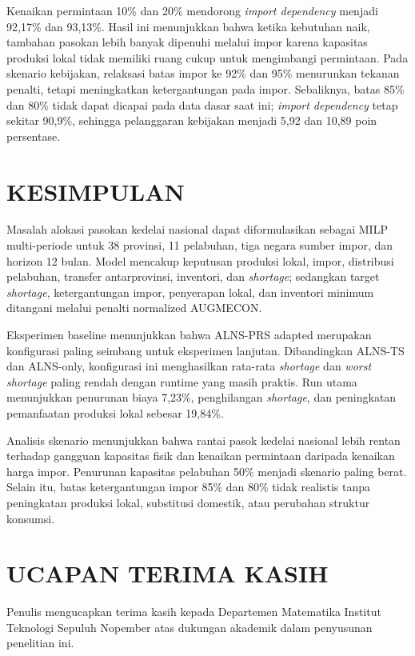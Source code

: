 \documentclass[journal]{IEEEtran}
\theoremstyle{definition}
\theoremstyle{definition}
\theoremstyle{plain}
\begin{document}
    Kenaikan permintaan 10\% dan 20\% mendorong \textit{import dependency} menjadi 92,17\% dan 93,13\%. Hasil ini menunjukkan bahwa ketika kebutuhan naik, tambahan pasokan lebih banyak dipenuhi melalui impor karena kapasitas produksi lokal tidak memiliki ruang cukup untuk mengimbangi permintaan. Pada skenario kebijakan, relaksasi batas impor ke 92\% dan 95\% menurunkan tekanan penalti, tetapi meningkatkan ketergantungan pada impor. Sebaliknya, batas 85\% dan 80\% tidak dapat dicapai pada data dasar saat ini; \textit{import dependency} tetap sekitar 90,9\%, sehingga pelanggaran kebijakan menjadi 5,92 dan 10,89 poin persentase.

    \section{KESIMPULAN}
    Masalah alokasi pasokan kedelai nasional dapat diformulasikan sebagai MILP multi-periode untuk 38 provinsi, 11 pelabuhan, tiga negara sumber impor, dan horizon 12 bulan. Model mencakup keputusan produksi lokal, impor, distribusi pelabuhan, transfer antarprovinsi, inventori, dan \textit{shortage}; sedangkan target \textit{shortage}, ketergantungan impor, penyerapan lokal, dan inventori minimum ditangani melalui penalti normalized AUGMECON.

    Eksperimen baseline menunjukkan bahwa ALNS-PRS adapted merupakan konfigurasi paling seimbang untuk eksperimen lanjutan. Dibandingkan ALNS-TS dan ALNS-only, konfigurasi ini menghasilkan rata-rata \textit{shortage} dan \textit{worst shortage} paling rendah dengan runtime yang masih praktis. Run utama menunjukkan penurunan biaya 7,23\%, penghilangan \textit{shortage}, dan peningkatan pemanfaatan produksi lokal sebesar 19,84\%.

    Analisis skenario menunjukkan bahwa rantai pasok kedelai nasional lebih rentan terhadap gangguan kapasitas fisik dan kenaikan permintaan daripada kenaikan harga impor. Penurunan kapasitas pelabuhan 50\% menjadi skenario paling berat. Selain itu, batas ketergantungan impor 85\% dan 80\% tidak realistis tanpa peningkatan produksi lokal, substitusi domestik, atau perubahan struktur konsumsi.

    \section*{UCAPAN TERIMA KASIH}
    Penulis mengucapkan terima kasih kepada Departemen Matematika Institut Teknologi Sepuluh Nopember atas dukungan akademik dalam penyusunan penelitian ini.
\end{document}
